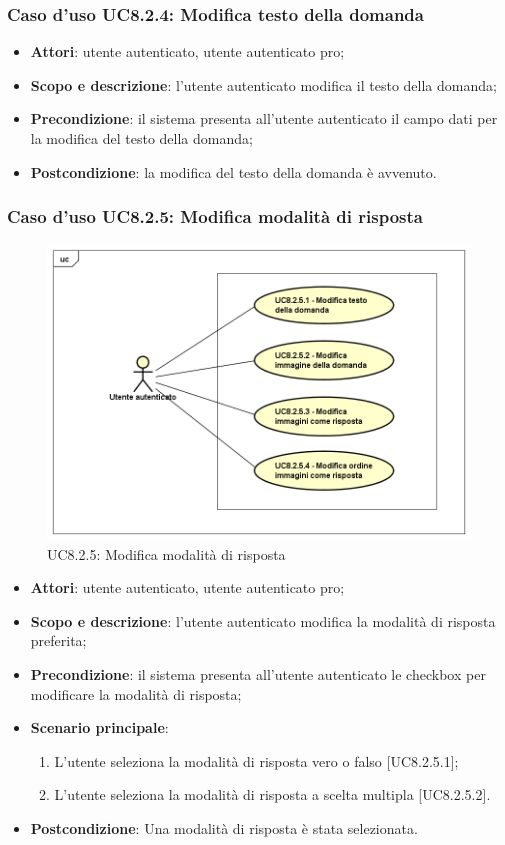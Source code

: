 	\subsubsection{Caso d'uso UC8.2.4: Modifica testo della domanda}
	\begin{itemize}
		\item
			\textbf{Attori}: utente autenticato, utente autenticato pro;
		\item
			\textbf{Scopo e descrizione}: l'utente autenticato modifica il testo della domanda;
		\item		
			\textbf{Precondizione}: il sistema presenta all'utente autenticato il campo dati per la modifica del testo della domanda;
		\item
			\textbf{Postcondizione}: la modifica del testo della domanda è avvenuto.
	\end{itemize}
	\subsubsection{Caso d'uso UC8.2.5: Modifica modalità di risposta}
	\label{UC8.2.5}
	\begin{figure}[h]
		\centering
			\includegraphics[scale=0.45,keepaspectratio]{UML/UC8_2_5.png}
		\caption{UC8.2.5: Modifica modalità di risposta}
	\end{figure}
	\FloatBarrier
	\begin{itemize}
		\item
			\textbf{Attori}: utente autenticato, utente autenticato pro;
		\item
			\textbf{Scopo e descrizione}: l'utente autenticato modifica la modalità di risposta preferita;
		\item		
			\textbf{Precondizione}: il sistema presenta all'utente autenticato le checkbox per modificare la modalità di risposta;
		\item
			\textbf{Scenario principale}:
	       		\begin{enumerate}
					\item
					L'utente seleziona la modalità di risposta vero o falso [UC8.2.5.1];
					\item
					L'utente seleziona la modalità di risposta a scelta multipla [UC8.2.5.2].
	       		\end{enumerate}
		\item
			\textbf{Postcondizione}: Una modalità di risposta è stata selezionata.
	\end{itemize}
